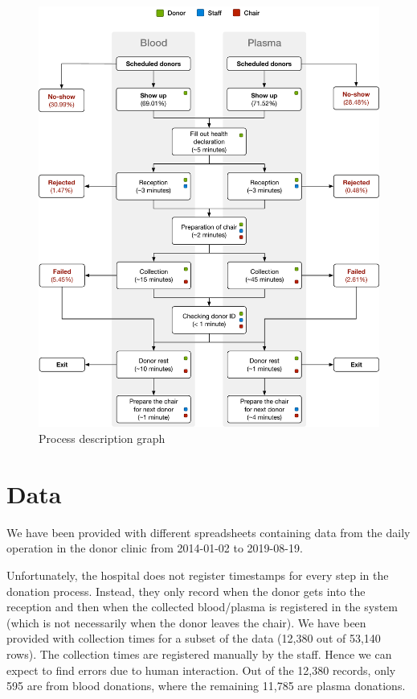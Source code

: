 \documentclass[a4paper,12pt]{article}
\begin{document}
\begin{figure}[H]
    \begin{center}
    \includegraphics[scale=0.58]{process.pdf}
    \end{center}
    \caption{Process description graph}
    \label{flow}
\end{figure}

\bigbreak
\section{Data}

We have been provided with different spreadsheets containing data from the daily operation in the donor clinic from 2014-01-02 to 2019-08-19.

\bigbreak

Unfortunately, the hospital does not register timestamps for every step in the donation process. Instead, they only record when the donor gets into the reception and then when the collected blood/plasma is registered in the system (which is not necessarily when the donor leaves the chair).
We have been provided with collection times for a subset of the data (12{,}380 out of 53{,}140 rows). The collection times are registered manually by the staff. Hence we can expect to find errors due to human interaction. Out of the 12{,}380 records, only 595 are from blood donations, where the remaining 11{,}785 are plasma donations.
\end{document}
